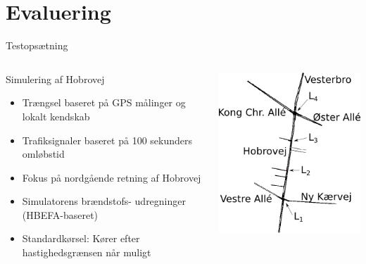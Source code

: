 \section{Evaluering}
\begin{frame}{Testopsætning}
\begin{columns}
\begin{column}{0.6\textwidth}
Simulering af Hobrovej
\begin{itemize}
\item Trængsel baseret på GPS målinger og lokalt kendskab
\item Trafiksignaler baseret på 100 sekunders omløbstid
\item Fokus på nordgående retning af Hobrovej
\item Simulatorens brændstofs- udregninger (HBEFA-baseret)
\item Standardkørsel: Kører efter hastighedsgrænsen når muligt
\end{itemize}
\end{column}

\begin{column}{0.5\textwidth}
\includegraphics[width=1\textwidth]{../images/HobrovejNy.png}
\end{column}
\end{columns}
\end{frame}

